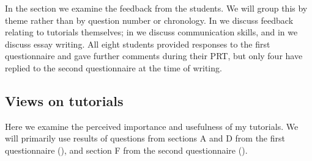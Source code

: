 In the section we examine the feedback from the students. We will group this by theme rather than by question number or chronology. In  we discuss feedback relating to tutorials themselves; in  we discuss communication skills, and in  we discuss essay writing. All eight students provided responses to the first questionnaire and gave further comments during their PRT, but only four have replied to the second questionnaire at the time of writing.

\subsection{Views on tutorials}\label{sec:tutor-results}

Here we examine the perceived importance and usefulness of my tutorials. We will primarily use results of questions from sections A and D from the first questionnaire (), and section F from the second questionnaire ().

